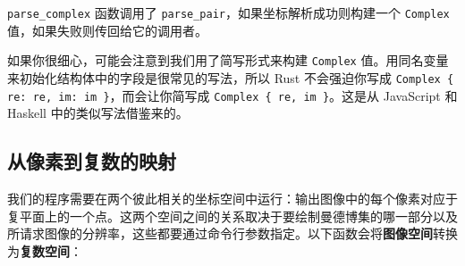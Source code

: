 \texttt{parse\_complex} 函数调用了 \texttt{parse\_pair}，如果坐标解析成功则构建一个 \texttt{Complex} 值，如果失败则传回给它的调用者。

如果你很细心，可能会注意到我们用了简写形式来构建 \texttt{Complex} 值。用同名变量来初始化结构体中的字段是很常见的写法，所以 Rust 不会强迫你写成 \texttt{Complex \{ re: re, im: im \}}，而会让你简写成 \texttt{Complex \{ re, im \}}。这是从 JavaScript 和 Haskell 中的类似写法借鉴来的。

\subsection{从像素到复数的映射}

我们的程序需要在两个彼此相关的坐标空间中运行：输出图像中的每个像素对应于复平面上的一个点。这两个空间之间的关系取决于要绘制曼德博集的哪一部分以及所请求图像的分辨率，这些都要通过命令行参数指定。以下函数会将\textbf{图像空间}转换为\textbf{复数空间}：

